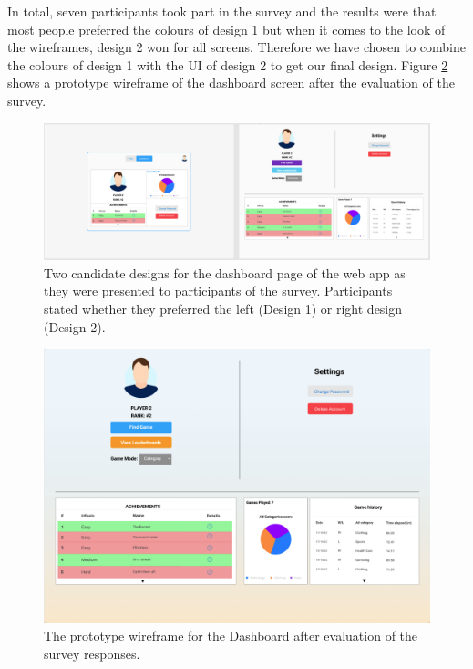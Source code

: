 \documentclass{l4proj}
\begin{document}
In total, seven participants took part in the survey and the results were that most people preferred the colours of design 1 but when it comes to the look of the wireframes, design 2 won for all screens. Therefore we have chosen to combine the colours of design 1 with the UI of design 2 to get our final design. Figure \ref{fig:finaldesign} shows a prototype wireframe of the dashboard screen after the evaluation of the survey.
\begin{figure}
    \centering
    \includegraphics[width=1\linewidth]{images/Dashboard.png}    

    \caption{Two candidate designs for the dashboard page of the web app as they were presented to participants of the survey. Participants stated whether they preferred the left (Design 1) or right design (Design 2). }

    \label{fig:wireframe} 
\end{figure}

\begin{figure}
    \centering
    \includegraphics[width=1\linewidth]{images/DashboardFinal.png}    

    \caption{The prototype wireframe for the Dashboard after evaluation of the survey responses. }

    \label{fig:finaldesign} 
\end{figure}
\end{document}
